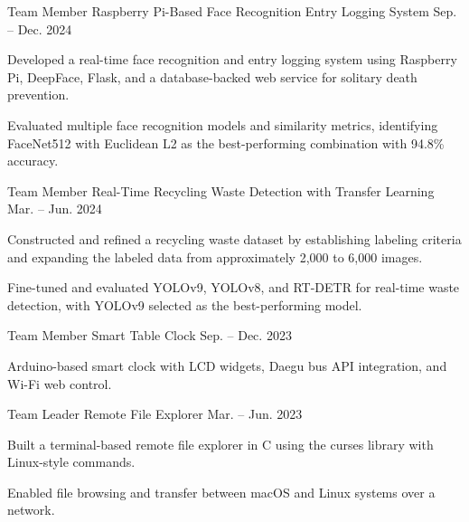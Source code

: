 \documentclass[11pt, a4paper]{awesome-cv}
\begin{document}
\begin{cventries}
  \cventry
    {Team Member}
    {Raspberry Pi-Based Face Recognition Entry Logging System}
    {}
    {Sep. -- Dec. 2024}
    {
      \begin{cvitems}
        \item {Developed a real-time face recognition and entry logging system using Raspberry Pi, DeepFace, Flask, and a database-backed web service for solitary death prevention.}
        \item {Evaluated multiple face recognition models and similarity metrics, identifying FaceNet512 with Euclidean L2 as the best-performing combination with 94.8\% accuracy.}
      \end{cvitems}
    }
  \cventry
    {Team Member}
    {Real-Time Recycling Waste Detection with Transfer Learning}
    {}
    {Mar. -- Jun. 2024}
    {
      \begin{cvitems}
        \item {Constructed and refined a recycling waste dataset by establishing labeling criteria and expanding the labeled data from approximately 2,000 to 6,000 images.}
        \item {Fine-tuned and evaluated YOLOv9, YOLOv8, and RT-DETR for real-time waste detection, with YOLOv9 selected as the best-performing model.}
      \end{cvitems}
    }
  \cventry
    {Team Member}
    {Smart Table Clock}
    {}
    {Sep. -- Dec. 2023}
    {
      \begin{cvitems}
        \item {Arduino-based smart clock with LCD widgets, Daegu bus API integration, and Wi-Fi web control.}
      \end{cvitems}
    }
  \cventry
    {Team Leader}
    {Remote File Explorer}
    {}
    {Mar. -- Jun. 2023}
    {
      \begin{cvitems}
        \item {Built a terminal-based remote file explorer in C using the curses library with Linux-style commands.}
        \item {Enabled file browsing and transfer between macOS and Linux systems over a network.}
      \end{cvitems}
    }
\end{cventries}
\end{document}
